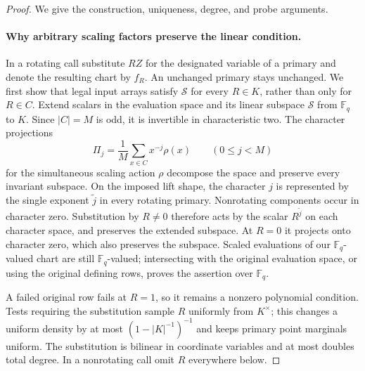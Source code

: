 \begin{proof}
We give the construction, uniqueness, degree, and probe arguments.

\paragraph{Why arbitrary scaling factors preserve the linear condition.}
In a rotating call substitute $RZ$ for the designated variable of a
primary and denote the resulting chart by $f_R$.  An unchanged primary
stays unchanged.  We first show that legal input arrays satisfy
$\mathcal S$ for every $R\in K$, rather than only for $R\in C$.
Extend scalars in the evaluation space and its linear subspace
$\mathcal S$ from $\mathbb F_q$ to $K$.  Since $|C|=M$ is odd, it is
invertible in characteristic two.  The character projections
\[
 \Pi_j=\frac1M\sum_{x\in C}x^{-j}\rho(x)
 \qquad(0\le j<M)
\]
for the simultaneous scaling action $\rho$ decompose the space and
preserve every invariant subspace.  On the imposed lift shape, the
character $j$ is represented by the single exponent $\widetilde j$
in every rotating primary.  Nonrotating components occur in character
zero.  Substitution by $R\ne0$ therefore acts by the scalar
$R^{\widetilde j}$ on each character space, and preserves the extended
subspace.  At $R=0$ it projects onto character zero, which also preserves
the subspace.  Scaled evaluations of our $\mathbb F_q$-valued chart
are still $\mathbb F_q$-valued; intersecting with the original
evaluation space, or using the original defining rows, proves the
assertion over $\mathbb F_q$.

A failed original row fails at $R=1$, so it remains a nonzero polynomial
condition.  Tests requiring the substitution sample $R$ uniformly from
$K^\times$; this changes a uniform density by at most
$(1-|K|^{-1})^{-1}$ and keeps primary point marginals uniform.  The
substitution is bilinear in coordinate variables and at most doubles
total degree.  In a nonrotating call omit $R$ everywhere below.


\end{proof}
